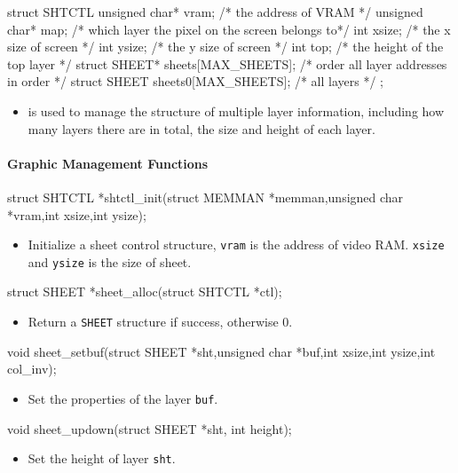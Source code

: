 \documentclass{swfcthesis}
\begin{document}
\begin{codeblock}[1]
\begin{ccode}
struct SHTCTL
{ 
  unsigned char* vram; /* the address of VRAM */
  unsigned char* map;  /* which layer the pixel on the screen belongs to*/
  int xsize; /* the x size of screen */
  int ysize; /* the y size of screen */
  int top;   /* the height of the top layer */
  struct SHEET* sheets[MAX_SHEETS]; /* order all layer addresses in order */
  struct SHEET sheets0[MAX_SHEETS]; /* all layers */
};
\end{ccode}
\end{codeblock}
\begin{itemize}
\item is used to manage the structure of multiple layer information, including how many
  layers there are in total, the size and height of each layer.
\end{itemize}

\paragraph{Graphic Management Functions}

\begin{ccode}
struct SHTCTL *shtctl_init(struct MEMMAN *memman,unsigned char *vram,int xsize,int ysize);
\end{ccode}
\begin{itemize}
\item Initialize a sheet control structure, \texttt{vram} is the address of video
  RAM. \texttt{xsize} and \texttt{ysize} is the size of sheet.
\end{itemize}

\begin{ccode}
struct SHEET *sheet_alloc(struct SHTCTL *ctl);
\end{ccode}
\begin{itemize}
\item Return a \texttt{SHEET} structure if success, otherwise 0.
\end{itemize}

\begin{ccode}
void sheet_setbuf(struct SHEET *sht,unsigned char *buf,int xsize,int ysize,int col_inv);
\end{ccode}
\begin{itemize}
\item Set the properties of the layer \texttt{buf}.
\end{itemize}

\begin{ccode}
void sheet_updown(struct SHEET *sht, int height);
\end{ccode}
\begin{itemize}
\item Set the height of layer \texttt{sht}.
\end{itemize}
\end{document}
